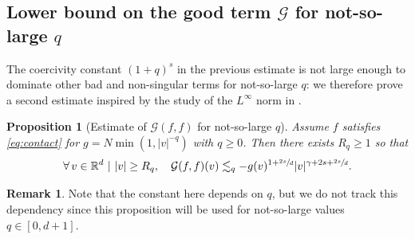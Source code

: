 \documentclass[JEP,XML,SOM,Unicode,NoFloatCountersInSection]{cedram}
\theoremstyle{plain}
\newtheorem{prop}[thm]{Proposition}
\theoremstyle{definition}
\newtheorem{remark}[thm]{Remark}
\numberwithin{equation}{section}
\newcommand{\R}{\mathbb R}
\let\A N
\begin{document}
\subsection{Lower bound on the good term $\mathcal{G}$ for
not-so-large $q$}

The coercivity constant $(1+q)^s$ in the previous estimate is not
large enough to dominate other bad and non-singular terms for
not-so-large $q$: we therefore prove a second estimate inspired by the
study of the $L^\infty$ norm in \cite{luis}.

\begin{prop}[Estimate of {$\mathcal{G} (f,f)$} for not-so-large
$q$] \label{prop:G} Assume $f$ satisfies \eqref{eq:contact} for
$g = \A \min(1,|v|^{-q})$ with $q \ge 0$. Then there exists
$R_q \geq 1$ so that
\[ \forall \, v \in \R^d \ | \ |v| \ge R_q, \quad \mathcal{G}
(f,f)(v) \lesssim_q - g(v)^{1+\sfrac{2s}d}
|v|^{\gamma+2s+\sfrac{2s}d}.
\]
\end{prop}
\begin{remark}
Note that the constant here depends on $q$, but we do not track this
dependency since this proposition will be used for not-so-large
values $q \in [0,d+1]$.
\end{remark}
\end{document}
